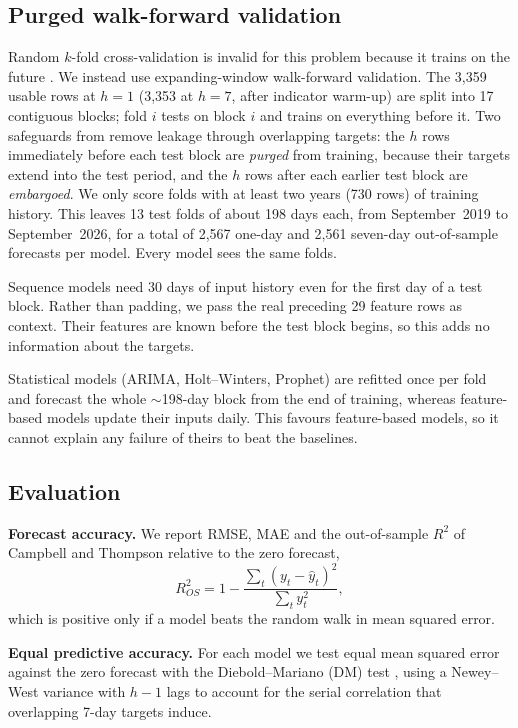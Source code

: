 \subsection{Purged walk-forward validation}
Random $k$-fold cross-validation is invalid for this problem because it trains on the future \cite{bergmeir2012}. We instead use expanding-window walk-forward validation. The 3{,}359 usable rows at $h=1$ (3{,}353 at $h=7$, after indicator warm-up) are split into 17 contiguous blocks; fold $i$ tests on block $i$ and trains on everything before it. Two safeguards from \cite{lopezdeprado2018} remove leakage through overlapping targets: the $h$ rows immediately before each test block are \emph{purged} from training, because their targets extend into the test period, and the $h$ rows after each earlier test block are \emph{embargoed}. We only score folds with at least two years (730 rows) of training history. This leaves 13 test folds of about 198 days each, from September~2019 to September~2026, for a total of 2{,}567 one-day and 2{,}561 seven-day out-of-sample forecasts per model. Every model sees the same folds.

Sequence models need 30 days of input history even for the first day of a test block. Rather than padding, we pass the real preceding 29 feature rows as context. Their features are known before the test block begins, so this adds no information about the targets.

Statistical models (ARIMA, Holt--Winters, Prophet) are refitted once per fold and forecast the whole $\sim$198-day block from the end of training, whereas feature-based models update their inputs daily. This favours feature-based models, so it cannot explain any failure of theirs to beat the baselines.

\subsection{Evaluation}
\textbf{Forecast accuracy.} We report RMSE, MAE and the out-of-sample $R^2$ of Campbell and Thompson \cite{campbell2008} relative to the zero forecast,
\begin{equation}
  R^2_{OS} = 1 - \frac{\sum_t (y_t - \hat y_t)^2}{\sum_t y_t^2},
\end{equation}
which is positive only if a model beats the random walk in mean squared error.

\textbf{Equal predictive accuracy.} For each model we test equal mean squared error against the zero forecast with the Diebold--Mariano (DM) test \cite{diebold1995}, using a Newey--West variance with $h-1$ lags to account for the serial correlation that overlapping 7-day targets induce.

